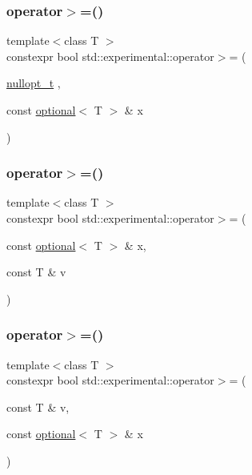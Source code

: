 \subsubsection{\texorpdfstring{operator$>$=()}{operator>=()}\hspace{0.1cm}{\footnotesize\ttfamily [3/9]}}
{\footnotesize\ttfamily template$<$class T $>$ \\
constexpr bool std\+::experimental\+::operator$>$= (\begin{DoxyParamCaption}\item[{\mbox{\hyperlink{structstd_1_1experimental_1_1nullopt__t}{nullopt\+\_\+t}}}]{,  }\item[{const \mbox{\hyperlink{classstd_1_1experimental_1_1optional}{optional}}$<$ T $>$ \&}]{x }\end{DoxyParamCaption})\hspace{0.3cm}{\ttfamily [noexcept]}}

\mbox{\label{namespacestd_1_1experimental_a3209ada3ae8542ffbdfcc7e7d35f19a5}} 
\subsubsection{\texorpdfstring{operator$>$=()}{operator>=()}\hspace{0.1cm}{\footnotesize\ttfamily [4/9]}}
{\footnotesize\ttfamily template$<$class T $>$ \\
constexpr bool std\+::experimental\+::operator$>$= (\begin{DoxyParamCaption}\item[{const \mbox{\hyperlink{classstd_1_1experimental_1_1optional}{optional}}$<$ T $>$ \&}]{x,  }\item[{const T \&}]{v }\end{DoxyParamCaption})}

\mbox{\label{namespacestd_1_1experimental_a0e2303b05ab975b9dd1a53c198bf2e45}} 
\subsubsection{\texorpdfstring{operator$>$=()}{operator>=()}\hspace{0.1cm}{\footnotesize\ttfamily [5/9]}}
{\footnotesize\ttfamily template$<$class T $>$ \\
constexpr bool std\+::experimental\+::operator$>$= (\begin{DoxyParamCaption}\item[{const T \&}]{v,  }\item[{const \mbox{\hyperlink{classstd_1_1experimental_1_1optional}{optional}}$<$ T $>$ \&}]{x }\end{DoxyParamCaption})}

